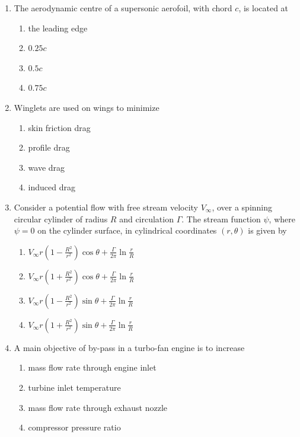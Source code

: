 \documentclass{article}
\begin{document}
\begin{enumerate}
\item The aerodynamic centre of a supersonic aerofoil, with chord $c$, is located at
\begin{multicols}{4}
\begin{enumerate}
\item the leading edge
\item $0.25c$
\item $0.5c$
\item $0.75c$
\end{enumerate}
\end{multicols}

\item Winglets are used on wings to minimize
\begin{multicols}{4}
\begin{enumerate}
\item skin friction drag
\item profile drag
\item wave drag
\item induced drag
\end{enumerate}
\end{multicols}

\item Consider a potential flow with free stream velocity $V_\infty$, over a spinning circular cylinder of radius $R$ and circulation $\Gamma$. The stream function $\psi$, where $\psi=0$ on the cylinder surface, in cylindrical coordinates $(r,\theta)$ is given by
\begin{multicols}{2}
\begin{enumerate}
\item $V_\infty r \left(1-\frac{R^2}{r^2}\right)\cos\theta + \frac{\Gamma}{2\pi}\ln\frac{r}{R}$
\item $V_\infty r \left(1+\frac{R^2}{r^2}\right)\cos\theta + \frac{\Gamma}{2\pi}\ln\frac{r}{R}$
\item $V_\infty r \left(1-\frac{R^2}{r^2}\right)\sin\theta + \frac{\Gamma}{2\pi}\ln\frac{r}{R}$
\item $V_\infty r \left(1+\frac{R^2}{r^2}\right)\sin\theta + \frac{\Gamma}{2\pi}\ln\frac{r}{R}$
\end{enumerate}
\end{multicols}

\item A main objective of by-pass in a turbo-fan engine is to increase
\begin{multicols}{2}
\begin{enumerate}
\item mass flow rate through engine inlet
\item turbine inlet temperature
\item mass flow rate through exhaust nozzle
\item compressor pressure ratio
\end{enumerate}
\end{multicols}


\end{enumerate}
\end{document}
